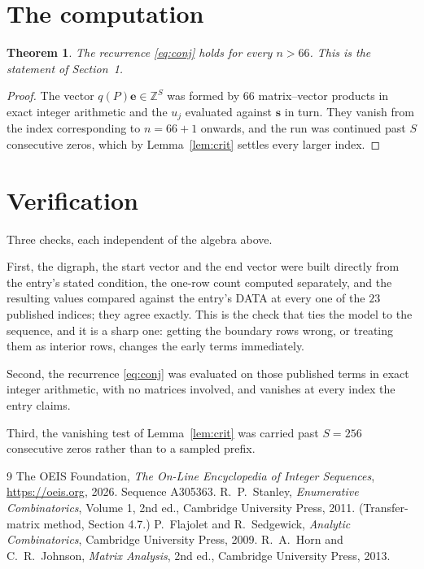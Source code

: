 \documentclass[11pt,a4paper]{article}
\theoremstyle{plain}
\newtheorem{theorem}{Theorem}
\theoremstyle{definition}
\begin{document}
\section{The computation}

\begin{theorem}
The recurrence \eqref{eq:conj} holds for every $n>66$. This is the statement of
Section~1.
\end{theorem}

\begin{proof}
The vector $q(P)\mathbf{e}\in\mathbb{Z}^{S}$ was formed by $66$ matrix--vector
products in exact integer arithmetic and the $u_j$ evaluated against $\mathbf{s}$ in turn.
They vanish from the index corresponding to $n=66+1$ onwards, and the run was continued
past $S$ consecutive zeros, which by Lemma~\ref{lem:crit} settles every larger index.
\end{proof}

\section{Verification}

Three checks, each independent of the algebra above.

First, the digraph, the start vector and the end vector were built directly from the
entry's stated condition, the one-row count computed separately, and the resulting values
compared against the entry's DATA at every one of the $23$ published indices; they
agree exactly. This is the check that ties the model to the sequence, and it is a sharp one:
getting the boundary rows wrong, or treating them as interior rows, changes the early terms
immediately.

Second, the recurrence \eqref{eq:conj} was evaluated on those published terms in exact
integer arithmetic, with no matrices involved, and vanishes at every index the entry claims.

Third, the vanishing test of Lemma~\ref{lem:crit} was carried past $S=256$ consecutive
zeros rather than to a sampled prefix.

\begin{thebibliography}{9}
 The OEIS Foundation, \emph{The On-Line Encyclopedia of Integer
Sequences}, \url{https://oeis.org}, 2026. Sequence A305363.
 R.~P.~Stanley, \emph{Enumerative Combinatorics}, Volume 1, 2nd ed.,
Cambridge University Press, 2011. (Transfer-matrix method, Section 4.7.)
 P.~Flajolet and R.~Sedgewick, \emph{Analytic Combinatorics}, Cambridge
University Press, 2009.
 R.~A.~Horn and C.~R.~Johnson, \emph{Matrix Analysis}, 2nd ed., Cambridge
University Press, 2013.
\end{thebibliography}
\end{document}

